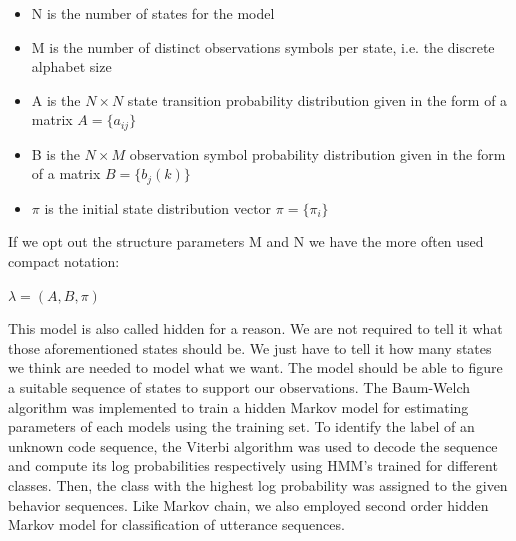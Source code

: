\documentclass{amia}
\begin{document}
\begin{itemize}
\item N is the number of states for the model
\item M is the number of distinct observations symbols per state, i.e. the discrete alphabet size
\item A is the $N\times N$ state transition probability distribution given in the form of a matrix $A = \{a_{ij}\}$
\item B is the $N\times M$ observation symbol probability distribution given in the form of a matrix $B = \{b_j(k)\}$
\item $\pi$ is the initial state distribution vector $\pi = \{\pi_i\}$
\end{itemize}

If we opt out the structure parameters M and N we have the more often used compact notation:

\begin{center}
$\lambda = (A, B, \pi)$
\end{center} 

This model is also called hidden for a reason. We are not required to tell it what those aforementioned states should be. We just have to tell it how many states we think are needed to model what we want. The model should be able to figure a suitable sequence of states to support our observations. The Baum-Welch algorithm was implemented to train a hidden Markov model for estimating parameters of each models using the training set. To identify the label of an unknown code sequence, the Viterbi algorithm was used to decode the sequence and compute its log probabilities respectively using HMM's trained for different classes. Then, the class with the highest log probability was assigned to the given behavior sequences. Like Markov chain, we also employed second order hidden Markov model for classification of utterance sequences.   
\end{document}
